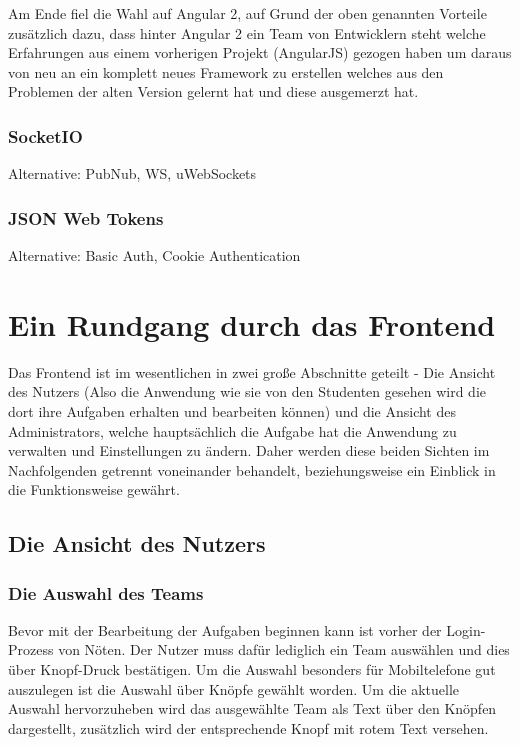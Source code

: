 Am Ende fiel die Wahl auf Angular 2, auf Grund der oben genannten Vorteile zusätzlich dazu, dass hinter Angular 2 ein Team von Entwicklern steht welche Erfahrungen aus einem vorherigen Projekt (AngularJS) gezogen haben um daraus von neu an ein komplett neues Framework zu erstellen welches aus den Problemen der alten Version gelernt hat und diese ausgemerzt hat.

\subsection{SocketIO}

Alternative: PubNub, WS, uWebSockets

\subsection{JSON Web Tokens} \label{JWT}

Alternative: Basic Auth, Cookie Authentication

\chapter{Ein Rundgang durch das Frontend}

Das Frontend ist im wesentlichen in zwei große Abschnitte geteilt - Die Ansicht des Nutzers (Also die Anwendung wie sie von den Studenten gesehen wird die dort ihre Aufgaben erhalten und bearbeiten können) und die Ansicht des Administrators, welche hauptsächlich die Aufgabe hat die Anwendung zu verwalten und Einstellungen zu ändern. Daher werden diese beiden Sichten im Nachfolgenden getrennt voneinander behandelt, beziehungsweise ein Einblick in die Funktionsweise gewährt.

\section{Die Ansicht des Nutzers}


\subsection{Die Auswahl des Teams}

Bevor mit der Bearbeitung der Aufgaben beginnen kann ist vorher der Login-Prozess von Nöten. Der Nutzer muss dafür lediglich ein Team auswählen und dies über Knopf-Druck bestätigen. Um die Auswahl besonders für Mobiltelefone gut auszulegen ist die Auswahl über Knöpfe gewählt worden. Um die aktuelle Auswahl hervorzuheben wird das ausgewählte Team als Text über den Knöpfen dargestellt, zusätzlich wird der entsprechende Knopf mit rotem Text versehen.

